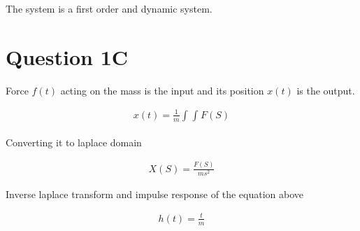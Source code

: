 \documentclass{article}
\begin{document}
The system is a first order and dynamic system.






\section{Question 1C}
Force $f(t)$ acting on the mass is the input and its position $ x(t)$ is the output.

\begin{equation*}
    \begin{aligned}
        x(t) = \frac{1}{m}\int_{}^{} \int_{}^{} F(S)
    \end{aligned}
\end{equation*} 

Converting it to laplace domain

\begin{equation*}
    \begin{aligned}
        X(S) = \frac{F(S)}{m s^2} 
    \end{aligned}
\end{equation*}

Inverse laplace transform and impulse response of the equation above

\begin{equation*}
    \begin{aligned}
        h(t) = \frac{t}{m}
    \end{aligned}
\end{equation*}

\end{document}
